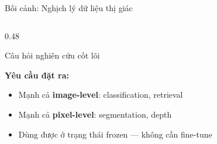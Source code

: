 \documentclass[aspectratio=169]{beamer}
\begin{document}
\begin{frame}[t,shrink=15]{Bối cảnh: Nghịch lý dữ liệu thị giác}
\begin{columns}[t]
\begin{column}{0.48\textwidth}
\begin{exampleblock}{Câu hỏi nghiên cứu cốt lõi}
                \vspace{0.15cm}
            \end{exampleblock}
            \vspace{0.25cm}
            \textbf{Yêu cầu đặt ra:}
            \begin{itemize}
                \item Mạnh cả \textbf{image-level}: classification, retrieval
                \item Mạnh cả \textbf{pixel-level}: segmentation, depth
                \item Dùng được ở trạng thái \alert{frozen} --- không cần fine-tune
            \end{itemize}
        \end{column}
    \end{columns}
\end{frame}
\end{document}
